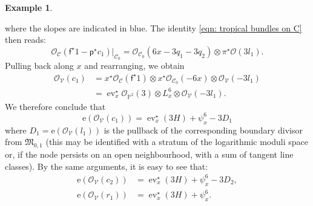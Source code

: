 \documentclass[11pt]{amsart}
\theoremstyle{definition}
\theoremstyle{definition}
\newtheorem{example}[theorem]{Example}
\DeclareMathOperator{\ev}{ev}
\newcommand{\e}{\mathrm{e}}
\newcommand{\PP}{\mathbb{P}}
\newcommand{\OO}{\mathcal{O}}
\newcommand{\Ccal}{\mathcal{C}}
\newcommand{\Mfrak}{\mathfrak{M}}
\begin{document}
\begin{example}
\begin{center}
\begin{tikzpicture}
\end{tikzpicture}	
\end{center}
where the slopes are indicated in blue. The identity \eqref{eqn: tropical bundles on C} then reads:
\begin{equation*} \OO_{\Ccal}(\mathsf{f}^\star 1 - \mathsf{p}^\star c_1)|_{\Ccal_0} = \OO_{\Ccal_0}(6x-3q_1 -3q_2) \otimes \pi^\star \OO(3l_1). \end{equation*}
Pulling back along $x$ and rearranging, we obtain
\begin{align*} \OO_{\mathcal{V}}(c_1) & = x^\star \OO_{\Ccal}(\mathsf{f}^\star 1) \otimes x^\star \OO_{\Ccal_0}(-6x) \otimes \OO_{\mathcal{V}}(-3l_1) \\
& = \ev_x^\star \OO_{\PP^2}(3) \otimes L_x^6 \otimes \OO_{\mathcal{V}}(-3l_1).\end{align*}
We therefore conclude that
\begin{equation*} \e (\OO_{\mathcal{V}}(c_1)) = \ev_x^\star (3H) + \psi_x^6 - 3D_1\end{equation*}
where $D_1=\e(\OO_{\mathcal{V}}(l_1))$ is the pullback of the corresponding boundary divisor from $\Mfrak_{0,1}$ (this may be identified with a stratum of the logarithmic moduli space or, if the node persists on an open neighbourhood, with a sum of tangent line classes). By the same arguments, it is easy to see that:
\begin{align*} \e(\OO_{\mathcal{V}}(c_2)) & = \ev_x^\star(3H) + \psi_x^6 - 3D_2, \\
\e(\OO_{\mathcal{V}}(r_1)) & = \ev_x^\star (3H) + \psi_x^6.\end{align*}\end{example}
\end{document}
